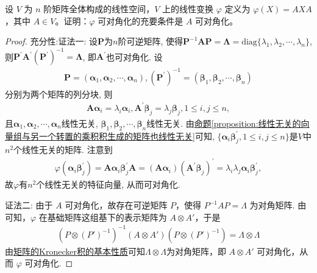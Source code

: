 \documentclass[../../main.tex]{subfiles}%
\begin{document}
\begin{example}\label{example:例题6.3548561684-(2)}
设 $V$ 为 $n$ 阶矩阵全体构成的线性空间，$V$ 上的线性变换 $\varphi$ 定义为 $\varphi(X)=AXA$，其中 $A\in V$。证明：$\varphi$ 可对角化的充要条件是 $A$ 可对角化。
\end{example}
\begin{proof}

{\heiti 充分性:}{\color{blue}证法一:}
设\(\boldsymbol{P}\)为\(n\)阶可逆矩阵, 使得\(\boldsymbol{P}^{-1}\boldsymbol{AP}=\boldsymbol{\Lambda}=\mathrm{diag}\{\lambda_{1},\lambda_{2},\cdots,\lambda_{n}\}\), 则\(\boldsymbol{P}^{\prime}\boldsymbol{A}^{\prime}(\boldsymbol{P}^{\prime})^{-1}=\boldsymbol{\Lambda}\), 即\(\boldsymbol{A}^{\prime}\)也可对角化. 设
\begin{align*}
\boldsymbol{P}=(\boldsymbol{\alpha}_{1},\boldsymbol{\alpha}_{2},\cdots,\boldsymbol{\alpha}_{n}), (\boldsymbol{P}^{\prime})^{-1}=(\boldsymbol{\beta}_{1},\boldsymbol{\beta}_{2},\cdots,\boldsymbol{\beta}_{n})
\end{align*}
分别为两个矩阵的列分块, 则
\begin{align*}
\boldsymbol{A}\boldsymbol{\alpha}_{i}=\lambda_{i}\boldsymbol{\alpha}_{i}, \boldsymbol{A}^{\prime}\boldsymbol{\beta}_{j}=\lambda_{j}\boldsymbol{\beta}_{j}, 1\leqslant  i,j\leqslant  n,
\end{align*}
且\(\boldsymbol{\alpha}_{1},\boldsymbol{\alpha}_{2},\cdots,\boldsymbol{\alpha}_{n}\)线性无关, \(\boldsymbol{\beta}_{1},\boldsymbol{\beta}_{2},\cdots,\boldsymbol{\beta}_{n}\)线性无关. 由\hyperref[proposition:线性无关的向量组与另一个转置的乘积积生成的矩阵也线性无关]{命题\ref{proposition:线性无关的向量组与另一个转置的乘积积生成的矩阵也线性无关}}可知, \(\{\boldsymbol{\alpha}_{i}\boldsymbol{\beta}_{j}^{\prime},1\leqslant  i,j\leqslant  n\}\)是\(V\)中\(n^{2}\)个线性无关的矩阵. 注意到
\begin{align*}
\varphi(\boldsymbol{\alpha}_{i}\boldsymbol{\beta}_{j}^{\prime})=\boldsymbol{A}\boldsymbol{\alpha}_{i}\boldsymbol{\beta}_{j}^{\prime}\boldsymbol{A}=(\boldsymbol{A}\boldsymbol{\alpha}_{i})(\boldsymbol{A}^{\prime}\boldsymbol{\beta}_{j})^{\prime}=\lambda_{i}\lambda_{j}\boldsymbol{\alpha}_{i}\boldsymbol{\beta}_{j}^{\prime},
\end{align*}
故\(\varphi\)有\(n^{2}\)个线性无关的特征向量, 从而可对角化. 

{\color{blue}证法二:}
由于 $A$ 可对角化，故存在可逆矩阵 $P$，使得 $P^{-1}AP = \varLambda$ 为对角矩阵. 由可知，$\varphi$ 在基础矩阵这组基下的表示矩阵为 $A\otimes A'$，于是
\begin{align*}
(P\otimes (P')^{-1})^{-1}(A\otimes A')(P\otimes (P')^{-1})=\varLambda\otimes\varLambda
\end{align*}
由\hyperref[theorem:矩阵的Kronecker积的基本性质]{矩阵的Kronecker积的基本性质}可知$\varLambda\otimes\varLambda$为对角矩阵，即 $A\otimes A'$ 可对角化，从而 $\varphi$ 可对角化. 


\end{proof}
\end{document}
